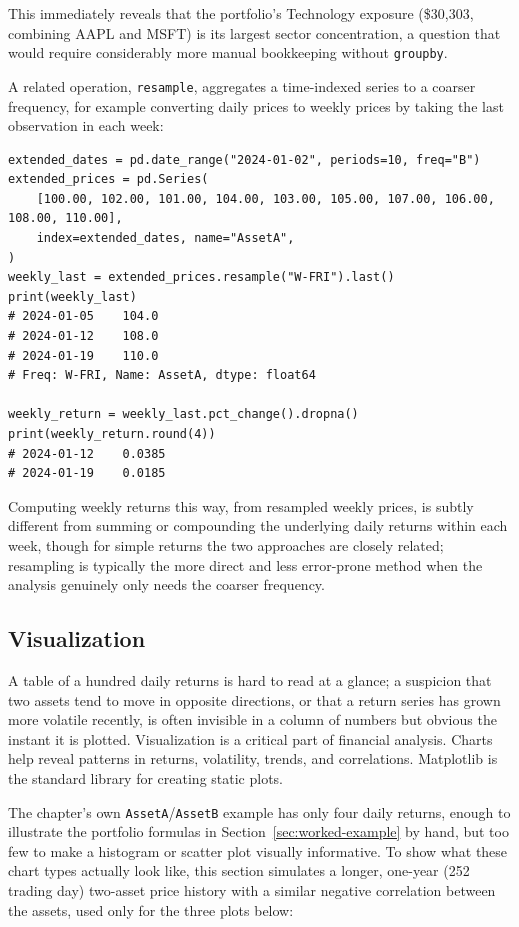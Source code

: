 \documentclass[../ai_in_finance]{subfiles}
\begin{document}
This immediately reveals that the portfolio's Technology exposure (\$30,303, combining AAPL and MSFT) is its largest sector concentration, a question that would require considerably more manual bookkeeping without \texttt{groupby}.

A related operation, \texttt{resample}, aggregates a time-indexed series to a coarser frequency, for example converting daily prices to weekly prices by taking the last observation in each week:

\begin{verbatim}
extended_dates = pd.date_range("2024-01-02", periods=10, freq="B")
extended_prices = pd.Series(
    [100.00, 102.00, 101.00, 104.00, 103.00, 105.00, 107.00, 106.00, 108.00, 110.00],
    index=extended_dates, name="AssetA",
)
weekly_last = extended_prices.resample("W-FRI").last()
print(weekly_last)
# 2024-01-05    104.0
# 2024-01-12    108.0
# 2024-01-19    110.0
# Freq: W-FRI, Name: AssetA, dtype: float64

weekly_return = weekly_last.pct_change().dropna()
print(weekly_return.round(4))
# 2024-01-12    0.0385
# 2024-01-19    0.0185
\end{verbatim}

Computing weekly returns this way, from resampled weekly prices, is subtly different from summing or compounding the underlying daily returns within each week, though for simple returns the two approaches are closely related; resampling is typically the more direct and less error-prone method when the analysis genuinely only needs the coarser frequency.

\subsection{Visualization}

A table of a hundred daily returns is hard to read at a glance; a suspicion that two assets tend to move in opposite directions, or that a return series has grown more volatile recently, is often invisible in a column of numbers but obvious the instant it is plotted. Visualization is a critical part of financial analysis. Charts help reveal patterns in returns, volatility, trends, and correlations. Matplotlib is the standard library for creating static plots.

The chapter's own \texttt{AssetA}/\texttt{AssetB} example has only four daily returns, enough to illustrate the portfolio formulas in Section~\ref{sec:worked-example} by hand, but too few to make a histogram or scatter plot visually informative. To show what these chart types actually look like, this section simulates a longer, one-year (252 trading day) two-asset price history with a similar negative correlation between the assets, used only for the three plots below:
\end{document}
